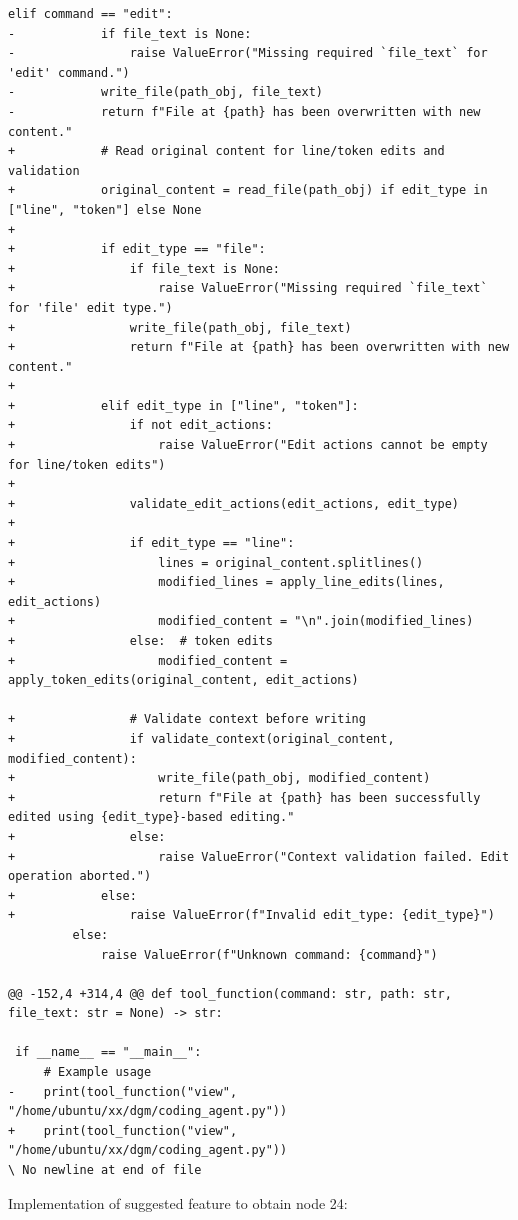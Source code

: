 \documentclass{article}
\begin{document}
\begin{lstlisting}[style=diffstyle]
         elif command == "edit":
-            if file_text is None:
-                raise ValueError("Missing required `file_text` for 'edit' command.")
-            write_file(path_obj, file_text)
-            return f"File at {path} has been overwritten with new content."
+            # Read original content for line/token edits and validation
+            original_content = read_file(path_obj) if edit_type in ["line", "token"] else None
+
+            if edit_type == "file":
+                if file_text is None:
+                    raise ValueError("Missing required `file_text` for 'file' edit type.")
+                write_file(path_obj, file_text)
+                return f"File at {path} has been overwritten with new content."
+
+            elif edit_type in ["line", "token"]:
+                if not edit_actions:
+                    raise ValueError("Edit actions cannot be empty for line/token edits")
+
+                validate_edit_actions(edit_actions, edit_type)
+
+                if edit_type == "line":
+                    lines = original_content.splitlines()
+                    modified_lines = apply_line_edits(lines, edit_actions)
+                    modified_content = "\n".join(modified_lines)
+                else:  # token edits
+                    modified_content = apply_token_edits(original_content, edit_actions)
 
+                # Validate context before writing
+                if validate_context(original_content, modified_content):
+                    write_file(path_obj, modified_content)
+                    return f"File at {path} has been successfully edited using {edit_type}-based editing."
+                else:
+                    raise ValueError("Context validation failed. Edit operation aborted.")
+            else:
+                raise ValueError(f"Invalid edit_type: {edit_type}")
         else:
             raise ValueError(f"Unknown command: {command}")
 
@@ -152,4 +314,4 @@ def tool_function(command: str, path: str, file_text: str = None) -> str:
 
 if __name__ == "__main__":
     # Example usage
-    print(tool_function("view", "/home/ubuntu/xx/dgm/coding_agent.py"))
+    print(tool_function("view", "/home/ubuntu/xx/dgm/coding_agent.py"))
\ No newline at end of file
\end{lstlisting}


Implementation of suggested feature to obtain node 24:
\end{document}
